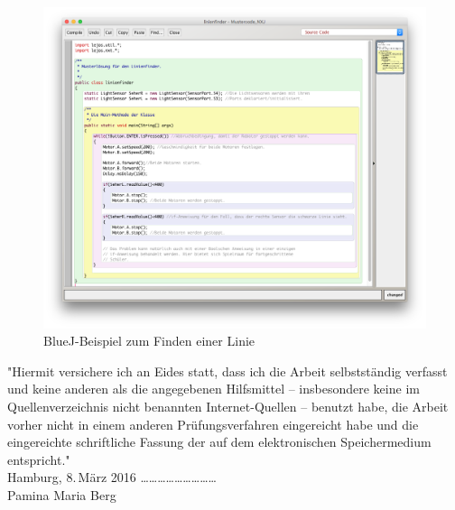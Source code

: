 \documentclass[paper=a4, DIV=13, BCOR=12mm, twoside=on, onecolumn=on, open = any, titlepage =on, parskip =half-, headsepline = on, footsepline = on, chapterprefix = on, sectionprefix = on, appendixprefix = off, fontsize = 11pt, numbers = noenddot, abstract = off]{scrreprt}
\begin{document}
\begin{figure}[htb]
\centering
\includegraphics[width=\textwidth]{images/linienfinder_bluej.png} 
\caption{BlueJ-Beispiel zum Finden einer Linie}
\label{fig:Bsp BlueJ Linienfinder}
\end{figure}



\newpage

\newpage



\cleardoublepage
\newpage
\thispagestyle{empty}
\vspace*{\fill}
"Hiermit versichere ich an Eides statt, dass ich die Arbeit selbstständig verfasst und keine anderen als die angegebenen Hilfsmittel – insbesondere keine im Quellenverzeichnis nicht benannten Internet-Quellen – benutzt habe, die Arbeit vorher nicht in einem anderen Prüfungsverfahren eingereicht habe und die eingereichte schriftliche Fassung der auf dem elektronischen Speichermedium entspricht."\\

Hamburg, 8.\,März 2016 \hspace*{\fill} \dots \dots \dots \dots \dots \dots \dots \dots \dots\\
\hspace*{\fill} Pamina Maria Berg \quad $\,$
\end{document}
